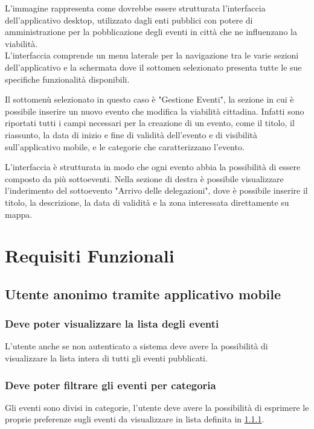 \documentclass{article}
\begin{document}
L'immagine rappresenta come dovrebbe essere strutturata l'interfaccia dell'applicativo desktop, utilizzato dagli enti pubblici con potere di amministrazione per la pobblicazione degli eventi in città che ne influenzano la viabilità.\\
L'interfaccia comprende un menu laterale per la navigazione tra le varie sezioni dell'applicativo e la schermata dove il sottomen selezionato presenta tutte le sue specifiche funzionalità disponibili.

Il sottomenù selezionato in questo caso è "Gestione Eventi", la sezione in cui è possibile inserire un nuovo evento che modifica la viabilità cittadina. Infatti sono riportati tutti i campi necessari per la creazione di un evento, come il titolo, il riassunto, la data di inizio e fine di validità dell'evento e di visibilità sull'applicativo mobile, e le categorie che caratterizzano l'evento.

L'interfaccia è strutturata in modo che ogni evento abbia la possibilità di essere composto da più sottoeventi. Nella sezione di destra è possibile visualizzare l'inderimento del sottoevento "Arrivo delle delegazioni", dove è possibile inserire il titolo, la descrizione, la data di validità e la zona interessata direttamente su mappa.\\

\clearpage

\section{Requisiti Funzionali}

\subsection{Utente anonimo tramite applicativo mobile}

\subsubsection{Deve poter visualizzare la lista degli eventi}\label{Requirements:Lista}
L'utente anche se non autenticato a sistema deve avere la possibilità di visualizzare la lista intera di tutti gli eventi pubblicati.

\subsubsection{Deve poter filtrare gli eventi per categoria}
Gli eventi sono divisi in categorie, l'utente deve avere la possibilità di esprimere le proprie preferenze sugli eventi da visualizzare in lista definita in \ref{Requirements:Lista}.
\end{document}
